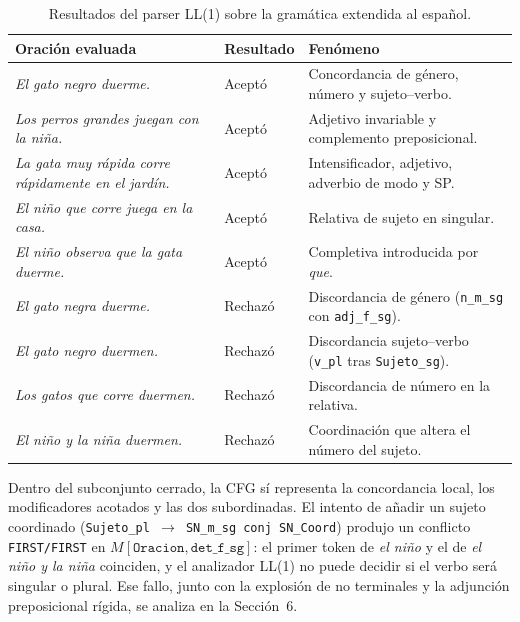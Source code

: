 \begin{table}[h!]
\centering
\small
\begin{tabular}{|p{}|l|p{}|}
\hline
\textbf{Oración evaluada} & \textbf{Resultado} & \textbf{Fenómeno} \\ \hline
\textit{El gato negro duerme.} & Aceptó & Concordancia de género, número y sujeto--verbo. \\ \hline
\textit{Los perros grandes juegan con la niña.} & Aceptó & Adjetivo invariable y complemento preposicional. \\ \hline
\textit{La gata muy rápida corre rápidamente en el jardín.} & Aceptó & Intensificador, adjetivo, adverbio de modo y SP. \\ \hline
\textit{El niño que corre juega en la casa.} & Aceptó & Relativa de sujeto en singular. \\ \hline
\textit{El niño observa que la gata duerme.} & Aceptó & Completiva introducida por \textit{que}. \\ \hline
\textit{El gato negra duerme.} & Rechazó & Discordancia de género (\texttt{n\_m\_sg} con \texttt{adj\_f\_sg}). \\ \hline
\textit{El gato negro duermen.} & Rechazó & Discordancia sujeto--verbo (\texttt{v\_pl} tras \texttt{Sujeto\_sg}). \\ \hline
\textit{Los gatos que corre duermen.} & Rechazó & Discordancia de número en la relativa. \\ \hline
\textit{El niño y la niña duermen.} & Rechazó & Coordinación que altera el número del sujeto. \\ \hline
\end{tabular}
\caption{Resultados del parser LL(1) sobre la gramática extendida al español.}
\end{table}

Dentro del subconjunto cerrado, la CFG sí representa la concordancia local, los modificadores acotados y las dos subordinadas. El intento de añadir un sujeto coordinado (\texttt{Sujeto\_pl $\rightarrow$ SN\_m\_sg conj SN\_Coord}) produjo un conflicto \texttt{FIRST/FIRST} en $M[\texttt{Oracion},\texttt{det\_f\_sg}]$: el primer token de \textit{el niño} y el de \textit{el niño y la niña} coinciden, y el analizador LL(1) no puede decidir si el verbo será singular o plural. Ese fallo, junto con la explosión de no terminales y la adjunción preposicional rígida, se analiza en la Sección~6.
